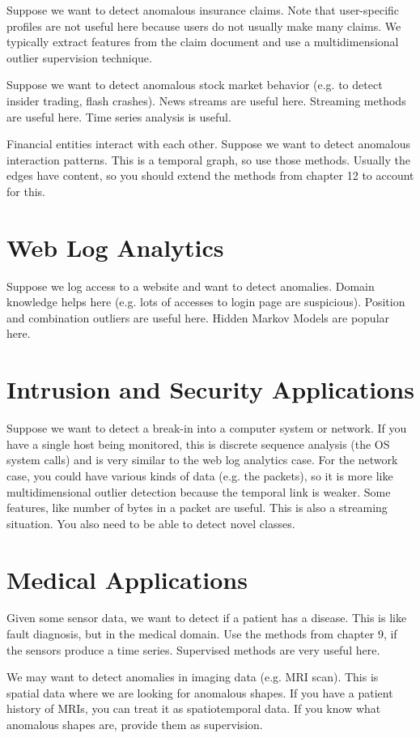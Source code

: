 \documentclass[a4paper]{article}
\begin{document}
Suppose we want to detect anomalous insurance claims. Note that user-specific
profiles are not useful here because users do not usually make many claims. We
typically extract features from the claim document and use a multidimensional
outlier supervision technique.

Suppose we want to detect anomalous stock market behavior (e.g. to detect
insider trading, flash crashes). News streams are useful here. Streaming
methods are useful here. Time series analysis is useful.

Financial entities interact with each other. Suppose we want to detect anomalous
interaction patterns. This is a temporal graph, so use those methods. Usually
the edges have content, so you should extend the methods from chapter 12 to
account for this.

\section{Web Log Analytics}
Suppose we log access to a website and want to detect anomalies. Domain knowledge
helps here (e.g. lots of accesses to login page are suspicious). Position
and combination outliers are useful here. Hidden Markov Models are popular here.

\section{Intrusion and Security Applications}
Suppose we want to detect a break-in into a computer system or network. If you
have a single host being monitored, this is discrete sequence analysis (the
OS system calls) and is very similar to the web log analytics case. For the
network case, you could have various kinds of data (e.g. the packets), so it
is more like multidimensional outlier detection because the temporal link is
weaker. Some features, like number of bytes in a packet are useful. This is also
a streaming situation. You also need to be able to detect novel classes.

\section{Medical Applications}
Given some sensor data, we want to detect if a patient has a disease. This is
like fault diagnosis, but in the medical domain. Use the methods from chapter 9,
if the sensors produce a time series. Supervised methods are very useful here.

We may want to detect anomalies in imaging data (e.g. MRI scan). This is spatial
data where we are looking for anomalous shapes. If you have a patient history of
MRIs, you can treat it as spatiotemporal data. If you know what anomalous shapes
are, provide them as supervision.
\end{document}

